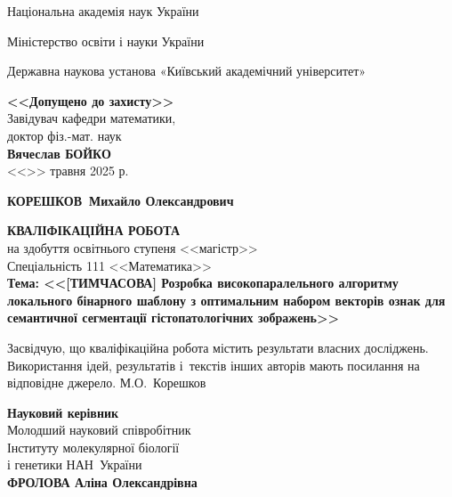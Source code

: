\documentclass{thesis}
\newcommand{\MyFullName}{КОРЕШКОВ~Михайло Олександрович}
\newcommand{\MyReverseInitialName}{М.О.~Корешков}
\newcommand{\ThesisName}{[ТИМЧАСОВА] Розробка високопаралельного алгоритму локального бінарного шаблону з оптимальним набором векторів ознак для семантичної сегментації гістопатологічних зображень}
\newcommand{\SuperviserFullName}{ФРОЛОВА Аліна Олександрівна}
\newcommand{\SuperviserAffiliation}{Молодший науковий співробітник\\Інституту молекулярної біології\\і генетики НАН~України}
\begin{document}
\allowdisplaybreaks

\large

\setcounter{page}{1}
\thispagestyle{empty}
\centerline{Національна академія наук України}
\centerline{Міністерство освіти і науки України}
\centerline{Державна наукова установа «Київський академічний університет»}

\vspace{10mm}

\begin{flushright}
\begin{minipage}{100mm}
\begin{center}\large {\bf <<Допущено до захисту>>}\\
Завідувач кафедри математики,\\
доктор фіз.-мат. наук\\
{\bf Вячеслав БОЙКО}\\
<<\underline{\hspace{8mm}}>> травня 2025 р.
\end{center}
\end{minipage}
\end{flushright}

\vspace{10mm}

\centerline{\Large \bf \MyFullName}

\begin{center}
{\bf КВАЛІФІКАЦІЙНА РОБОТА}\\
на здобуття освітнього ступеня <<магістр>>\\
Спеціальність 111 <<Математика>>\\[4mm]
{\Large \bf Тема: <<\ThesisName>>}
\end{center}


\vspace{5mm}

\noindent
{Засвідчую, що кваліфікаційна робота містить результати власних досліджень. Використання ідей, результатів і~текстів інших авторів мають посилання на відповідне джерело.
\underline{\hspace{18mm}} \MyReverseInitialName \par}

\vspace{5mm}

\begin{flushright}
\begin{minipage}{90mm}
\large {\bf Науковий керівник}\\
\SuperviserAffiliation\\
{\bf \SuperviserFullName }\\
\underline{\hspace{48mm}}

\end{minipage}
\end{flushright}
\end{document}
